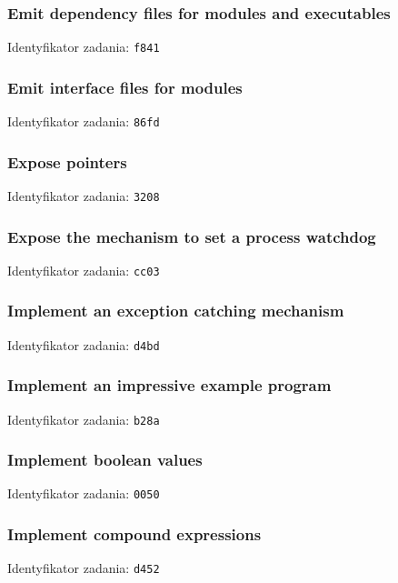 \subsubsection{Emit dependency files for modules and executables}

Identyfikator zadania: \texttt{f841}

\subsubsection{Emit interface files for modules}

Identyfikator zadania: \texttt{86fd}

\subsubsection{Expose pointers}

Identyfikator zadania: \texttt{3208}

\subsubsection{Expose the mechanism to set a process watchdog}

Identyfikator zadania: \texttt{cc03}

\subsubsection{Implement an exception catching mechanism}

Identyfikator zadania: \texttt{d4bd}

\subsubsection{Implement an impressive example program}

Identyfikator zadania: \texttt{b28a}

\subsubsection{Implement boolean values}

Identyfikator zadania: \texttt{0050}

\subsubsection{Implement compound expressions}

Identyfikator zadania: \texttt{d452}

